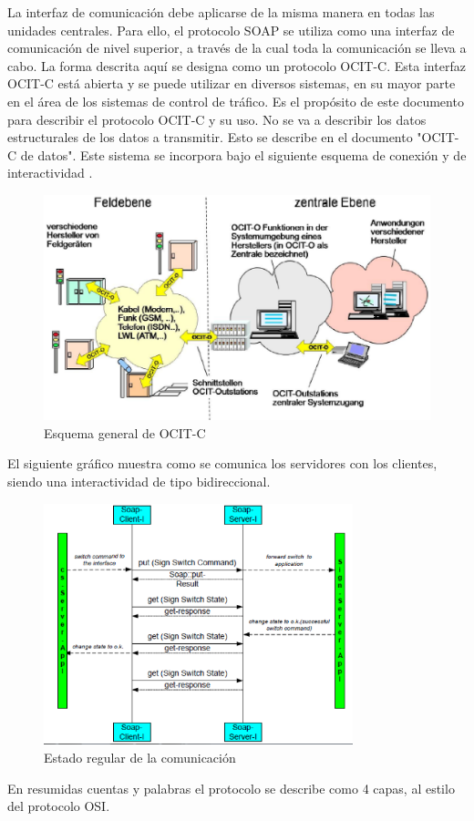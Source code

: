  La interfaz de comunicación debe aplicarse de la misma manera en todas las unidades centrales. Para ello, el protocolo SOAP se utiliza como una interfaz de comunicación de nivel superior, a través de la cual toda la comunicación se lleva a cabo. La forma descrita aquí se designa como un protocolo OCIT-C.
 Esta interfaz OCIT-C está abierta y se puede utilizar en diversos sistemas, en su mayor parte en el área de los sistemas de control de tráfico. Es el propósito de este documento para describir el protocolo OCIT-C y su uso. No se va a describir los datos estructurales de los datos a transmitir. Esto se describe en el documento "OCIT-C de datos".
 Este sistema se incorpora bajo el siguiente esquema de conexión y de interactividad \cite{17}.
 \begin{figure}[h]
    \centering
    \includegraphics[width=1\textwidth]{ima/ocit_php7K8DbI}
    \caption{Esquema general de OCIT-C \cite{11}}
    \label{fig:mesh12}
\end{figure}
 El siguiente gráfico muestra como se comunica los servidores con los clientes, siendo una interactividad de tipo bidireccional.
 \begin{figure}[h]
    \centering
    \includegraphics[width=0.8\textwidth]{ima/ocit1_phpVmReMk}
    \caption{Estado regular de la comunicación \cite{17}}
    \label{fig:mesh13}
\end{figure}
 En resumidas cuentas y palabras el protocolo se describe como 4 capas, al estilo del protocolo OSI\cite{17}.

